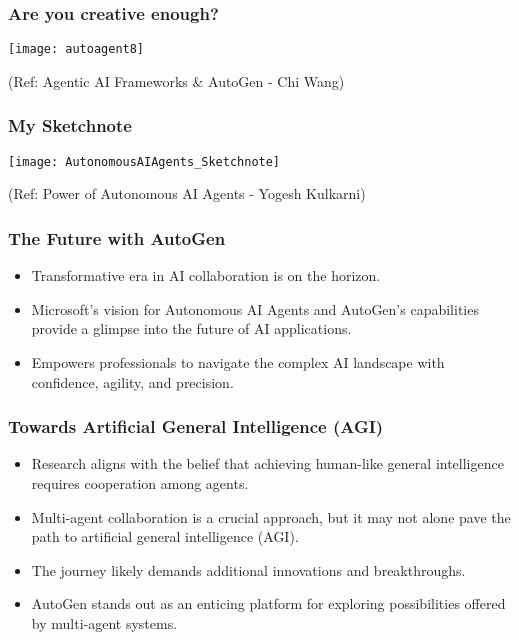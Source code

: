 \begin{frame}[fragile]\frametitle{Are you creative enough?}
		\begin{center}
		\texttt{[image: autoagent8]}
		\end{center}
		
		{\tiny (Ref: Agentic AI Frameworks \& AutoGen - Chi Wang)}
\end{frame}
  

\begin{frame}[fragile]\frametitle{My Sketchnote}
	
	\begin{center}
	\texttt{[image: AutonomousAIAgents\_Sketchnote]}
	\end{center}
{\tiny (Ref: Power of Autonomous AI Agents - Yogesh Kulkarni)}
\end{frame}

\begin{frame}[fragile]\frametitle{The Future with AutoGen}
  \begin{itemize}
    \item Transformative era in AI collaboration is on the horizon.
    \item Microsoft’s vision for Autonomous AI Agents and AutoGen's capabilities provide a glimpse into the future of AI applications.
    \item Empowers professionals to navigate the complex AI landscape with confidence, agility, and precision.
  \end{itemize}
\end{frame}

\begin{frame}[fragile]\frametitle{Towards Artificial General Intelligence (AGI)}
  \begin{itemize}
    \item Research aligns with the belief that achieving human-like general intelligence requires cooperation among agents.
    \item Multi-agent collaboration is a crucial approach, but it may not alone pave the path to artificial general intelligence (AGI).
    \item The journey likely demands additional innovations and breakthroughs.
	\item AutoGen stands out as an enticing platform for exploring possibilities offered by multi-agent systems.
  \end{itemize}
\end{frame}
